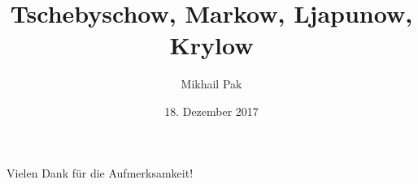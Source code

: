 \documentclass[11pt, ngerman]{beamer}
\title{Tschebyschow, Markow, Ljapunow, Krylow}
\date{18. Dezember 2017}
\author{Mikhail Pak}
\institute{CC BY-NC-SA 4.0}
\begin{document}
  \maketitle

  

  

  

  

  

  \begin{frame}
    \centering
    Vielen Dank für die Aufmerksamkeit!
  \end{frame}
\end{document}
